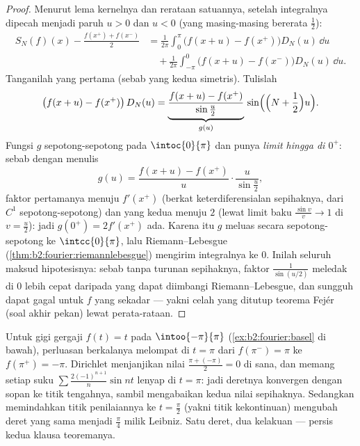 \begin{proof}
Menurut lema kernelnya dan rerataan satuannya, setelah integralnya dipecah
menjadi paruh $u > 0$ dan $u < 0$ (yang masing-masing bererata $\frac12$):
\begin{align*}
S_N(f)(x) - \frac{f(x^+) + f(x^-)}{2}
&= \frac{1}{2\pi}\int_{0}^{\pi} \bigl(f(x+u) -
f(x^+)\bigr)D_N(u)\,\dd u\\
&\quad+ \frac{1}{2\pi}\int_{-\pi}^{0}\bigl(f(x+u) -
f(x^-)\bigr)D_N(u)\,\dd u .
\end{align*}
Tanganilah yang pertama (sebab yang kedua simetris). Tulislah
\[
\bigl(f(x + u) - f(x^+)\bigr)\,D_N(u)
= \underbrace{\frac{f(x+u) - f(x^+)}{\sin\frac u2}}_{g(u)}\,
\sin\Bigl(\Bigl(N + \frac12\Bigr)u\Bigr) .
\]
Fungsi $g$  sepotong-sepotong pada $\intoc{0}{\pi}$ dan
punya \emph{limit hingga di $0^+$}: sebab dengan menulis
\[
g(u) = \frac{f(x+u) - f(x^+)}{u}\cdot\frac{u}{\sin\frac u2} ,
\]
faktor pertamanya menuju $f'(x^+)$ (berkat keterdiferensialan
sepihaknya, dari $C^1$ sepotong-sepotong) dan yang kedua menuju $2$
(lewat limit baku $\frac{\sin v}{v} \to 1$ di $v = \frac
u2$): jadi $g(0^+) = 2f'(x^+)$ ada. Karena itu $g$ meluas secara
 sepotong-sepotong ke $\intcc{0}{\pi}$, lalu Riemann--Lebesgue
(\cref{thm:b2:fourier:riemannlebesgue}) mengirim integralnya ke
$0$. Inilah seluruh maksud hipotesisnya: sebab tanpa
turunan sepihaknya, faktor $\frac{1}{\sin(u/2)}$ meledak
di $0$ lebih cepat daripada yang dapat diimbangi Riemann--Lebesgue, dan
 sungguh dapat gagal untuk $f$ yang sekadar
 --- yakni celah yang ditutup teorema Fejér (soal akhir pekan)
lewat perata-rataan.
\end{proof}

\begin{example}\label{ex:b2:fourier:jumpvalue}
Untuk gigi gergaji $f(t) = t$ pada $\intoo{-\pi}{\pi}$
(\cref{ex:b2:fourier:basel} di bawah), perluasan berkalanya
melompat di $t = \pi$ dari $f(\pi^-) = \pi$ ke $f(\pi^+) = -\pi$.
Dirichlet menjanjikan nilai $\frac{\pi + (-\pi)}{2} = 0$
di sana, dan memang setiap suku $\sum
\frac{2(-1)^{n+1}}{n}\sin nt$ lenyap di $t = \pi$: jadi
deretnya konvergen dengan sopan ke titik tengahnya, sambil mengabaikan kedua
nilai sepihaknya. Sedangkan memindahkan titik penilaiannya ke $t =
\frac\pi2$ (yakni titik kekontinuan) mengubah deret yang sama
menjadi $\frac\pi4$ milik Leibniz. Satu deret, dua kelakuan ---
persis kedua klausa teoremanya.
\end{example}

